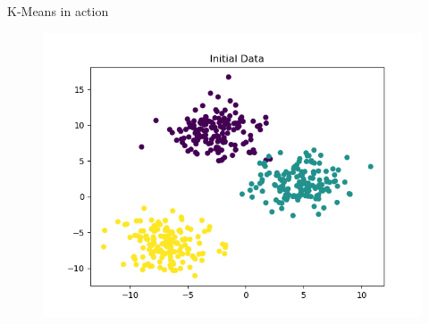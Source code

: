 \documentclass[serif, aspectratio=169]{beamer}
\begin{document}
\begin{frame}{K-Means in action}
    \begin{figure}
        \centering
        \includegraphics[width=\textwidth]{kmeans_in_action_figures/original.png}
    \end{figure}
\end{frame}
\end{document}
